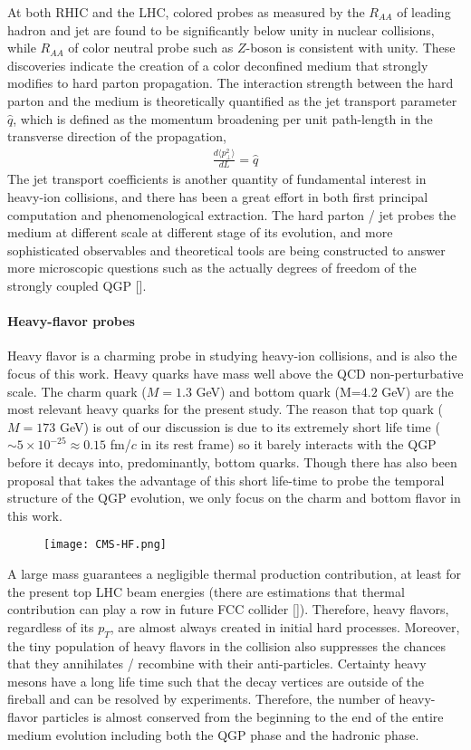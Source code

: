 At both RHIC and the LHC, colored probes as measured by the $R_{AA}$ of leading hadron and jet are found to be significantly below unity in nuclear collisions, while  $R_{AA}$ of color neutral probe such as $Z$-boson is consistent with unity.
These discoveries indicate the creation of a color deconfined medium that strongly modifies to hard parton propagation.
The interaction strength between the hard parton and the medium is theoretically quantified as the jet transport parameter $\hat{q}$, which is defined as the momentum broadening per unit path-length in the transverse direction of the propagation,
\begin{eqnarray}
\frac{d\langle p_\perp^2 \rangle}{dL} = \hat{q}
\end{eqnarray}
The jet transport coefficients is another quantity of fundamental interest  in heavy-ion collisions, and there has been a great effort in both first principal computation and phenomenological extraction.
The hard parton / jet probes the medium at different scale at different stage of its evolution, and more sophisticated observables and theoretical tools are being constructed to answer more microscopic questions such as the actually degrees of freedom of the strongly coupled QGP [].

\paragraph{Heavy-flavor probes}
Heavy flavor is a charming probe in studying heavy-ion collisions, and is also the focus of this work.
Heavy quarks have mass well above the QCD non-perturbative scale.
The charm quark ($M=1.3$ GeV) and bottom quark (M=$4.2$ GeV) are the most relevant heavy quarks for the present study.
The reason that top quark ($M = 173$ GeV) is out of our discussion is due to its extremely short life time ($\sim 5\times 10^{-25} \approx 0.15$  fm/$c$ in its rest frame) so it barely interacts with the QGP before it decays into, predominantly, bottom quarks.
Though there has also been proposal that takes the advantage of this short life-time to probe the temporal structure of the QGP evolution, we only focus on the charm and bottom flavor in this work.

\begin{figure}
\centering
\texttt{[image: CMS-HF.png]}
\caption{}
\label{fig:intro:Raa}
\end{figure}

A large mass guarantees a negligible thermal production contribution, at least for the present top LHC beam energies (there are estimations that thermal contribution can play a row in future FCC collider []).
Therefore, heavy flavors, regardless of its $p_T$, are almost always created in initial hard processes.
Moreover, the tiny population of heavy flavors in the collision also suppresses the chances that they annihilates / recombine with their anti-particles.
Certainty heavy mesons have a long life time such that the decay vertices are outside of the fireball and can be resolved by experiments.
Therefore, the number of heavy-flavor particles is almost conserved from the beginning to the end of the entire medium evolution including both the QGP phase and the hadronic phase.


